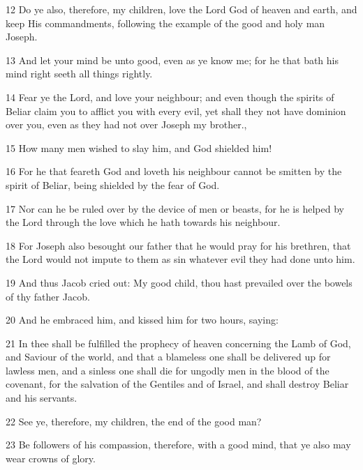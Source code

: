 \par 12 Do ye also, therefore, my children, love the Lord God of heaven and earth, and keep His commandments, following the example of the good and holy man Joseph.

\par 13 And let your mind be unto good, even as ye know me; for he that bath his mind right seeth all things rightly.

\par 14 Fear ye the Lord, and love your neighbour; and even though the spirits of Beliar claim you to afflict you with every evil, yet shall they not have dominion over you, even as they had not over Joseph my brother.,

\par 15 How many men wished to slay him, and God shielded him!

\par 16 For he that feareth God and loveth his neighbour cannot be smitten by the spirit of Beliar, being shielded by the fear of God.

\par 17 Nor can he be ruled over by the device of men or beasts, for he is helped by the Lord through the love which he hath towards his neighbour.

\par 18 For Joseph also besought our father that he would pray for his brethren, that the Lord would not impute to them as sin whatever evil they had done unto him.

\par 19 And thus Jacob cried out: My good child, thou hast prevailed over the bowels of thy father Jacob.

\par 20 And he embraced him, and kissed him for two hours, saying:

\par 21 In thee shall be fulfilled the prophecy of heaven concerning the Lamb of God, and Saviour of the world, and that a blameless one shall be delivered up for lawless men, and a sinless one shall die for ungodly men in the blood of the covenant, for the salvation of the Gentiles and of Israel, and shall destroy Beliar and his servants.

\par 22 See ye, therefore, my children, the end of the good man?

\par 23 Be followers of his compassion, therefore, with a good mind, that ye also may wear crowns of glory.

